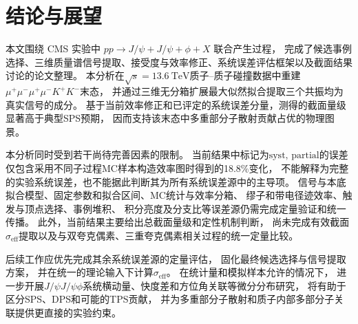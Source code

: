 \section{结论与展望}
\label{sec:conclusion-outlook}

本文围绕 CMS 实验中 \(pp \to J/\psi + J/\psi + \phi + X\) 联合产生过程，
完成了候选事例选择、三维质量谱信号提取、接受度与效率修正、系统误差评估框架以及截面结果讨论的论文整理。
本分析在$\sqrt{s}=\SI{13.6}{\tera\eV}$质子--质子碰撞数据中重建
\(\mu^+\mu^-\mu^+\mu^-K^+K^-\)末态，
并通过三维无分箱扩展最大似然拟合提取三个共振均为真实信号的成分。
基于当前效率修正和已评定的系统误差分量，测得的截面量级显著高于典型SPS预期，
因而支持该末态中多重部分子散射贡献占优的物理图景。

本分析同时受到若干尚待完善因素的限制。
当前结果中标记为$\mathrm{syst,\,partial}$的误差仅包含采用不同子过程MC样本构造效率图时得到的18.8\%变化，
不能解释为完整的实验系统误差，也不能据此判断其为所有系统误差源中的主导项。
信号与本底拟合模型、固定参数和拟合区间、MC统计与效率分箱、
缪子和带电径迹效率、触发与顶点选择、事例堆积、
积分亮度及分支比等误差源仍需完成定量验证和统一传播。
此外，当前结果主要给出总截面量级和定性机制判断，
尚未完成有效截面\(\sigma_{\mathrm{eff}}\)提取以及与双夸克偶素、三重夸克偶素相关过程的统一定量比较。

后续工作应优先完成其余系统误差源的定量评估，
固化最终候选选择与信号提取方案，
并在统一的理论输入下计算\(\sigma_{\mathrm{eff}}\)。
在统计量和模拟样本允许的情况下，
进一步开展\(J/\psi J/\psi \phi\)系统横动量、快度差和方位角关联等微分分布研究，
将有助于区分SPS、DPS和可能的TPS贡献，
并为多重部分子散射和质子内部多部分子关联提供更直接的实验约束。
